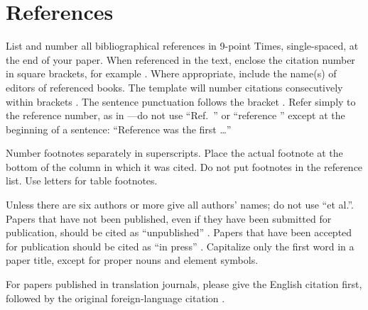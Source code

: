 \documentclass[conference,pbalance]{iaria}
\begin{document}
\section*{References}
List and number all bibliographical references in 9-point Times, single-spaced, at the end of your paper. When referenced in the text, enclose the citation number in square brackets, for example \cite{eason1955certain}. Where appropriate, include the name(s) of editors of referenced books. The template will number citations consecutively within brackets \cite{eason1955certain}. The sentence punctuation follows the bracket \cite{maxwell1873treatise}. Refer simply to the reference number, as in \cite{jacobs1963fine}—do not use “Ref.\ \cite{jacobs1963fine}” or “reference \cite{jacobs1963fine}” except at the beginning of a sentence: “Reference \cite{jacobs1963fine} was the first \ldots”

Number footnotes separately in superscripts. Place the actual footnote at the bottom of the column in which it was cited. Do not put footnotes in the reference list. Use letters for table footnotes.

Unless there are six authors or more give all authors’ names; do not use “et al.”. Papers that have not been published, even if they have been submitted for publication, should be cited as “unpublished” \cite{four}. Papers that have been accepted for publication should be cited as “in press” \cite{five}. Capitalize only the first word in a paper title, except for proper nouns and element symbols.

For papers published in translation journals, please give the English citation first, followed by the original foreign-language citation \cite{yorozu1987electron}.

\nocite{kornack2001cell}
\nocite{kito2013emergent}
\nocite{goto2007efficient}


\vfill %
\begingroup
\sloppy
\printbibliography
\endgroup 
\end{document}
